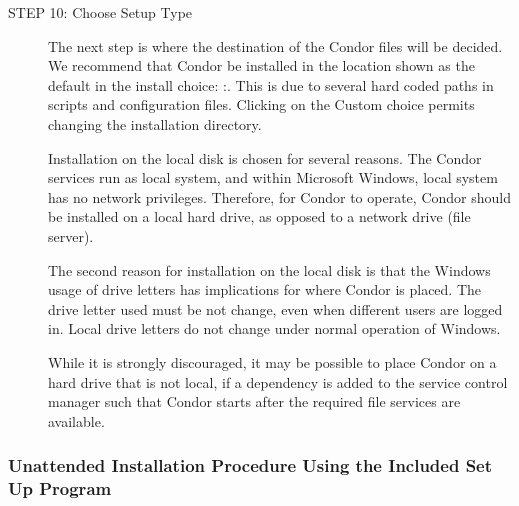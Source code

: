 \begin{description}
\item[STEP 10: Choose Setup Type]

The next step is where the destination of the Condor files will be
decided.
We recommend that Condor be installed in the location shown as the default 
in the install choice:
\verb@C:\Condor@. This is due to several hard coded
paths in scripts and configuration files.
Clicking on the Custom choice permits changing the installation directory.

Installation on the local disk is chosen for several reasons.
The Condor services run as local system, and within Microsoft Windows, 
local system has no network privileges.
Therefore, for Condor to operate, 
Condor should be installed on a local hard drive,
as opposed to a network drive (file server).

The second reason for installation on the local disk is that
the Windows usage of drive letters has implications for where
Condor is placed.
The drive letter used must be not change, even when different users are
logged in.
Local drive letters do not change under normal operation of Windows.

While it is strongly discouraged, 
it may be possible to place Condor on a hard drive that is not local,
if a dependency is added to the service control manager
such that Condor starts after the required file services
are available.


\end{description}


\subsubsection{\label{sec:nt-unattended-install-procedure}
Unattended Installation Procedure Using the Included Set Up Program}

